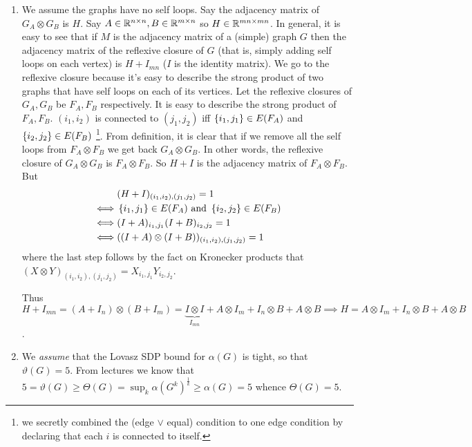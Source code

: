 \begin{enumerate}[leftmargin=*]
\item We assume the graphs have no self loops. Say the adjacency matrix of $G_{A}\otimes G_{B}$ is $H$. Say $A\in \mathbb{R}^{n\times n}, B\in \mathbb{R}^{m\times n}$ so $H\in \mathbb{R}^{mn\times mn}$. In general, it is easy to see that if $M$ is the adjacency matrix of a (simple) graph $G$ then the adjacency matrix of the reflexive closure of $G$ (that is, simply adding self loops on each vertex) is $H+I_{mn}$ ($I$ is the identity matrix). We go to the reflexive closure because it's easy to describe the strong product of two graphs that have self loops on each of its vertices. Let the reflexive closures of $G_{A}, G_{B}$ be $F_{A}, F_{B}$ respectively. It is easy to describe the strong product of $F_{A}, F_{B}$. $(i_{1},i_{2})$ is connected to $(j_{1},j_{2})$ iff $\left\{i_{1},j_{1}\right\}\in E(F_{A})$ and $\left\{i_{2},j_{2}\right\}\in E(F_{B})$
\footnote{we secretly combined the (edge $\lor$ equal) condition to one edge condition by declaring that each $i$ is connected to itself.}. From definition, it is clear that if we remove all the self loops from $F_{A}\otimes F_{B}$ we get back $G_{A}\otimes G_{B}$. In other words, the reflexive closure of $G_{A}\otimes G_{B}$ is $F_{A}\otimes F_{B}$. So $H+I$ is the adjacency matrix of $F_{A}\otimes F_{B}$. But 
\begin{align*}
&(H+I)_{(i_{1},i_{2}),(j_{1},j_{2})} = 1\\
\iff &\left\{i_{1},j_{1}\right\}\in E(F_{A}) \text{ and }\left\{i_{2},j_{2}\right\}\in E(F_{B})\\
\iff &(I+A)_{i_{1},j_{1}} (I+B)_{i_{2},j_{2}}=1\\
\iff &((I+A)\otimes (I+B))_{(i_{1},i_{2}),(j_{1},j_{2})} = 1
\end{align*}
where the last step follows by the fact on Kronecker products that $(X\otimes Y)_{(i_{1},i_{2}),(j_{1},j_{2})} = X_{i_{1},j_{1}}Y_{i_{2},j_{2}}$.

Thus $H+I_{mn} = (A+I_{n})\otimes (B+I_{m}) = \underbrace{I\otimes I}_{I_{mn}} + A\otimes I_{m} + I_{n}\otimes B + A \otimes B \implies H = \boxed{A\otimes I_{m} + I_{n}\otimes B + A \otimes B}$.

\item We \textit{assume} that the Lovasz SDP bound for $\alpha(G)$ is tight, so that $\vartheta(G) = 5$. From lectures we know that $5 = \vartheta(G)\ge \Theta(G) = \sup_{k}\alpha(G^{k})^{\frac1k} \ge \alpha(G) = 5$ whence $\Theta(G) = 5$.
\end{enumerate}


{}




